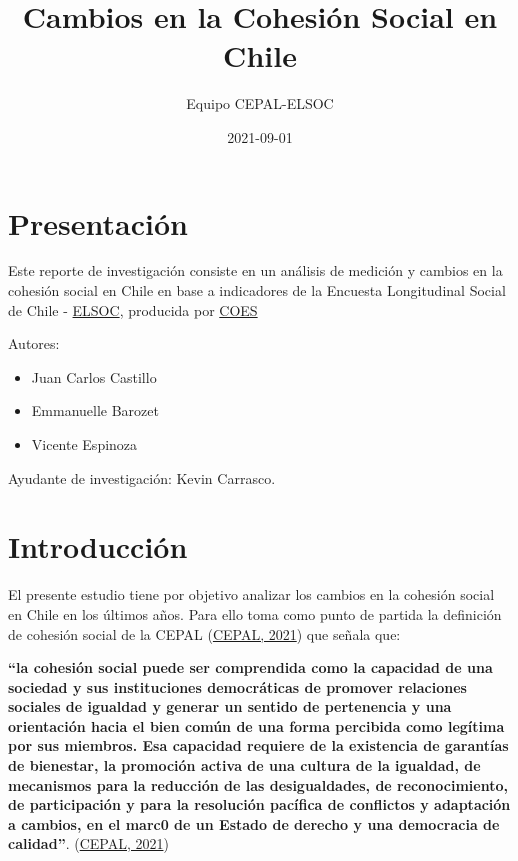 \documentclass[
  12pt,
]{book}
\title{Cambios en la Cohesión Social en Chile}
\author{Equipo CEPAL-ELSOC}
\date{2021-09-01}
\providecommand{\tightlist}{%
  \setlength{\itemsep}{0pt}\setlength{\parskip}{0pt}}
\begin{document}
\maketitle

{
\hypersetup{linkcolor=}
\setcounter{tocdepth}{1}
\tableofcontents
}
\listoffigures
\listoftables
{}
\hypertarget{presentaciuxf3n}{%
\chapter*{Presentación}\label{presentaciuxf3n}}

Este reporte de investigación consiste en un análisis de medición y cambios en la cohesión social en Chile en base a indicadores de la Encuesta Longitudinal Social de Chile - \href{https://coes.cl/encuesta-panel/}{ELSOC}, producida por \href{https://coes.cl/}{COES}

Autores:

\begin{itemize}
\tightlist
\item
  Juan Carlos Castillo
\item
  Emmanuelle Barozet
\item
  Vicente Espinoza
\end{itemize}

Ayudante de investigación: Kevin Carrasco.

\hypertarget{introducciuxf3n}{%
\chapter*{Introducción}\label{introducciuxf3n}}

El presente estudio tiene por objetivo analizar los cambios en la cohesión social en Chile en los últimos años. Para ello toma como punto de partida la definición de cohesión social de la CEPAL (\protect\hyperlink{ref-cepal_Cohesion_2021}{CEPAL, 2021}) que señala que:

\textbf{``la cohesión social puede ser comprendida como la capacidad de una sociedad y sus instituciones democráticas de promover relaciones sociales de igualdad y generar un sentido de pertenencia y una orientación hacia el bien común de una forma percibida como legítima por sus miembros. Esa capacidad requiere de la existencia de garantías de bienestar, la promoción activa de una cultura de la igualdad, de mecanismos para la reducción de las desigualdades, de reconocimiento, de participación y para la resolución pacífica de conflictos y adaptación a cambios, en el marc0 de un Estado de derecho y una democracia de calidad''}. (\protect\hyperlink{ref-cepal_Cohesion_2021}{CEPAL, 2021})
\end{document}

